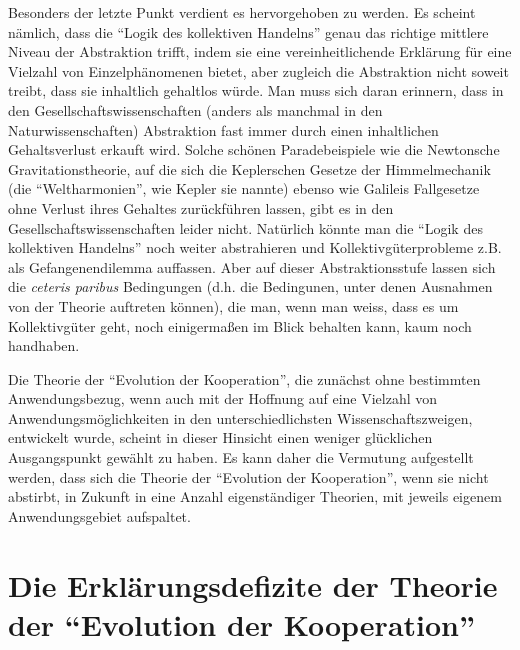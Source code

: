 \documentclass[12pt,a4paper,ngerman]{article}
\begin{document}
Besonders der letzte Punkt verdient es hervorgehoben zu werden. Es
scheint nämlich, dass die "`Logik des kollektiven Handelns"' genau das
richtige mittlere Niveau der Abstraktion trifft, indem sie eine
vereinheitlichende Erklärung für eine Vielzahl von Einzelphänomenen
bietet, aber zugleich die Abstraktion nicht soweit treibt, dass sie
inhaltlich gehaltlos würde. Man muss sich daran erinnern, dass in den
Gesellschaftswissenschaften (anders als manchmal in den
Naturwissenschaften) Abstraktion fast immer durch einen inhaltlichen
Gehaltsverlust erkauft wird. Solche schönen Paradebeispiele wie die
Newtonsche Gravitationstheorie, auf die sich die Keplerschen Gesetze
der Himmelmechanik (die "`Weltharmonien"', wie Kepler sie nannte)
ebenso wie Galileis Fallgesetze ohne Verlust ihres Gehaltes
zurückführen lassen, gibt es in den Gesellschaftswissenschaften leider
nicht. Natürlich könnte man die "`Logik des kollektiven Handelns"'
noch weiter abstrahieren und Kollektivgüterprobleme z.B. als
Gefangenendilemma auffassen. Aber auf dieser Abstraktionsstufe lassen
sich die {\em ceteris paribus} Bedingungen (d.h. die Bedingunen, unter
denen Ausnahmen von der Theorie auftreten können), die man, wenn man
weiss, dass es um Kollektivgüter geht, noch einigermaßen im Blick
behalten kann, kaum noch handhaben.

Die Theorie der "`Evolution der Kooperation"', die zunächst ohne
bestimmten Anwendungsbezug, wenn auch mit der Hoffnung auf eine
Vielzahl von Anwendungsmöglichkeiten in den unterschiedlichsten
Wissenschaftszweigen, entwickelt wurde, scheint in dieser Hinsicht
einen weniger glücklichen Ausgangspunkt gewählt zu haben. Es kann
daher die Vermutung aufgestellt werden, dass sich die Theorie der
"`Evolution der Kooperation"', wenn sie nicht abstirbt, in Zukunft
in eine Anzahl eigenständiger Theorien, mit jeweils eigenem
Anwendungsgebiet aufspaltet.


\section{Die Erklärungsdefizite der Theorie der
"`Evolution der Kooperation"'}
\end{document}
